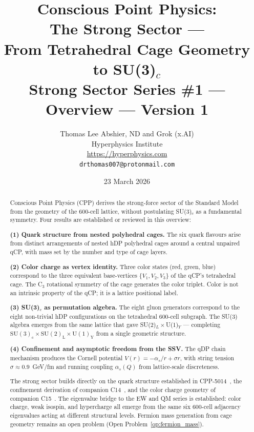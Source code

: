 \documentclass[11pt,a4paper]{article}
\title{\textbf{Conscious Point Physics:\\
The Strong Sector ---\\
From Tetrahedral Cage Geometry to SU(3)$_c$}\\[6pt]
{\large Strong Sector Series \#1 --- Overview --- Version 1}}
\author{Thomas Lee Abshier, ND and Grok (x.AI)\\
Hyperphysics Institute\\
\url{https://hyperphysics.com}\\
\texttt{drthomas007@protonmail.com}}
\date{23 March 2026}
\newcommand{\as}{\alpha_s}
\begin{document}
\maketitle

\begin{abstract}
Conscious Point Physics (CPP) derives the strong-force sector of the
Standard Model from the geometry of the 600-cell lattice, without
postulating SU(3)$_c$ as a fundamental symmetry.  Four results are
established or reviewed in this overview:

\textbf{(1) Quark structure from nested polyhedral cages.}
The six quark flavours arise from distinct arrangements of nested
hDP polyhedral cages around a central unpaired qCP, with mass
set by the number and type of cage layers.

\textbf{(2) Color charge as vertex identity.}
Three color states (red, green, blue) correspond to the three
equivalent base-vertices $\{V_1, V_2, V_3\}$ of the qCP's
tetrahedral cage.  The C$_3$ rotational symmetry of the cage
generates the color triplet.  Color is not an intrinsic property
of the qCP; it is a lattice positional label.

\textbf{(3) SU(3)$_c$ as permutation algebra.}
The eight gluon generators correspond to the eight non-trivial
hDP configurations on the tetrahedral 600-cell subgraph.  The
SU(3) algebra emerges from the same lattice that gave
SU(2)$_L\times$U(1)$_Y$ --- completing
$\mathrm{SU(3)_c \times SU(2)_L \times U(1)_Y}$ from a single
geometric structure.

\textbf{(4) Confinement and asymptotic freedom from the SSV.}
The qDP chain mechanism produces the Cornell potential
$V(r) = -\as/r + \sigma r$, with string tension $\sigma \approx
0.9$~GeV/fm and running coupling $\as(Q)$ from lattice-scale
discreteness.

The strong sector builds directly on the quark structure established
in CPP-5014~\citep{cpp5014}, the confinement derivation of companion
C14~\citep{c14}, and the color charge geometry of companion
C15~\citep{c15}.  The eigenvalue bridge to the EW and QM series
is established: color charge, weak isospin, and hypercharge all
emerge from the same six 600-cell adjacency eigenvalues acting at
different structural levels.  Fermion mass generation from cage
geometry remains an open problem (Open
Problem~\ref{op:fermion_mass}).
\end{abstract}

\tableofcontents
\newpage

\end{document}
